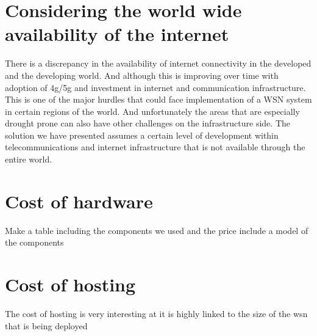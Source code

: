 \documentclass[]{uiophd}
\begin{document}
\section{Considering the world wide availability of the internet}
There is a discrepancy in the availability of internet connectivity in the developed and the developing world. And although this is improving over time with adoption of 4g/5g and investment in internet and communication infrastructure. This is one of the major hurdles that could face implementation of a WSN system in certain regions of the world. And unfortunately the areas that are especially drought prone can also have other challenges on the infrastructure side. The solution we have presented assumes a certain level of development within telecommunications and internet infrastructure that is not available through the entire world.
\section{Cost of hardware}
Make a table including the components we used and the price
include a model of the components

\section{Cost of hosting}
The cost of hosting is very interesting at it is highly linked to the size of the wsn that is being deployed
\end{document}
